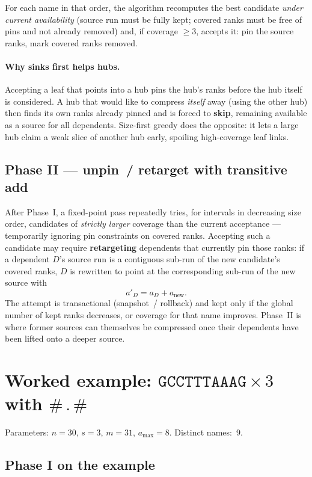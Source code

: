 \documentclass[11pt,a4paper]{article}
\begin{document}
For each name in that order, the algorithm recomputes the best
candidate \emph{under current availability} (source run must be fully
kept; covered ranks must be free of pins and not already removed) and,
if coverage \(\ge 3\), accepts it: pin the source ranks, mark covered
ranks removed.

\paragraph{Why sinks first helps hubs.}
Accepting a leaf that points into a hub pins the hub's ranks before
the hub itself is considered. A hub that would like to compress
\emph{itself} away (using the other hub) then finds its own ranks
already pinned and is forced to \textbf{skip}, remaining available as
a source for all dependents. Size-first greedy does the opposite: it
lets a large hub claim a weak slice of another hub early, spoiling
high-coverage leaf links.

\subsection{Phase II --- unpin~/ retarget with transitive add}

After Phase~I, a fixed-point pass repeatedly tries, for intervals in
decreasing size order, candidates of \emph{strictly larger} coverage
than the current acceptance --- temporarily ignoring pin constraints
on covered ranks. Accepting such a candidate may require
\textbf{retargeting} dependents that currently pin those ranks: if a
dependent \(D\)'s source run is a contiguous sub-run of the new
candidate's covered ranks, \(D\) is rewritten to point at the
corresponding sub-run of the new source with
\[
a'_D = a_D + a_{\mathrm{new}}.
\]
The attempt is transactional (snapshot~/ rollback) and kept only if
the global number of kept ranks decreases, or coverage for that name
improves. Phase~II is where former sources can themselves be
compressed once their dependents have been lifted onto a deeper
source.

\section{Worked example:
\(\mathtt{GCCTTTAAAG}{\times}3\) with \(\mathtt{\#\,.\,\#}\)}

Parameters: \(n=30\), \(s=3\), \(m=31\), \(a_{\max}=8\). Distinct
names:~9.

\subsection{Phase I on the example}
\end{document}
